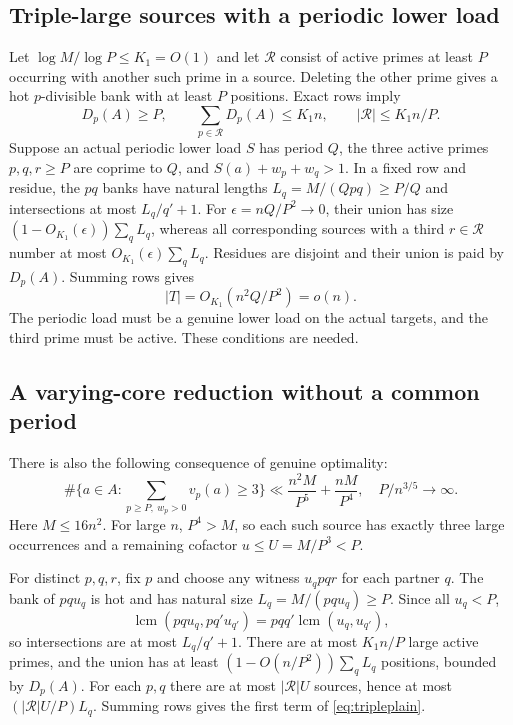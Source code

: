 \documentclass[11pt,a4paper]{article}
\begin{document}
\subsection{Triple-large sources with a periodic lower load}
Let $\log M/\log P\le K_1=O(1)$ and let $\mathcal R$ consist of
active primes at least $P$ occurring with another such prime in a
source. Deleting the other prime gives a hot $p$-divisible bank with
at least $P$ positions. Exact rows imply
\[
 D_p(A)\ge P,\qquad \sum_{p\in\mathcal R}D_p(A)\le K_1n,
 \qquad |\mathcal R|\le K_1n/P.
\]
Suppose an actual periodic lower load $S$ has period $Q$, the three
active primes $p,q,r\ge P$ are coprime to $Q$, and
$S(a)+w_p+w_q>1$. In a fixed row and residue, the $pq$ banks have
natural lengths $L_q=M/(Qpq)\ge P/Q$ and intersections at most
$L_q/q'+1$. For $\epsilon=nQ/P^2\to0$, their union has size
$(1-O_{K_1}(\epsilon))\sum_qL_q$, whereas all corresponding sources
with a third $r\in\mathcal R$ number at most
$O_{K_1}(\epsilon)\sum_qL_q$. Residues are disjoint and their union
is paid by $D_p(A)$. Summing rows gives
\begin{equation}
 |T|=O_{K_1}(n^2Q/P^2)=o(n).                           \label{eq:tripleperiod}
\end{equation}
The periodic load must be a genuine lower load on the actual targets,
and the third prime must be active. These conditions are needed.

\subsection{A varying-core reduction without a common period}
There is also the following consequence of genuine optimality:
\begin{equation}
 \boxed{\quad
 \#\{a\in A:\sum_{p\ge P,\ w_p>0}v_p(a)\ge3\}
 \ll\frac{n^2M}{P^5}+\frac{nM}{P^4},
 \quad P/n^{3/5}\longrightarrow\infty.
 \quad}                                                       \label{eq:tripleplain}
\end{equation}
Here $M\le16n^2$. For large $n$, $P^4>M$, so each such source has
exactly three large occurrences and a remaining cofactor
$u\le U=M/P^3<P$.

For distinct $p,q,r$, fix $p$ and choose any witness $u_qpqr$ for each
partner $q$. The bank of $pqu_q$ is hot and has natural size
$L_q=M/(pqu_q)\ge P$. Since all $u_q<P$,
\[
 \operatorname{lcm}(pqu_q,pq'u_{q'})
 =pqq'\operatorname{lcm}(u_q,u_{q'}),
\]
so intersections are at most $L_q/q'+1$. There are at most
$K_1n/P$ large active primes, and the union has at least
$(1-O(n/P^2))\sum_qL_q$ positions, bounded by $D_p(A)$.
For each $p,q$ there are at most $|\mathcal R|U$ sources, hence at
most $(|\mathcal R|U/P)L_q$. Summing rows gives the first term of
\eqref{eq:tripleplain}.
\end{document}
